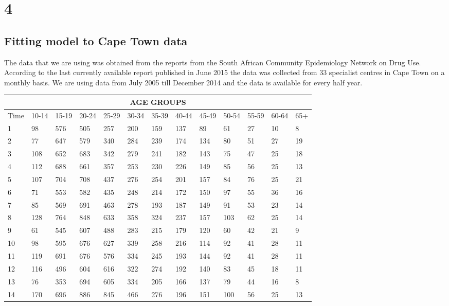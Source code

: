 \chapter{4}
\section{Fitting model to Cape Town data}
The data that we are using was obtained from the reports from the South African Community Epidemiology Network on Drug Use. According to the last currently available report published in June 2015 the data was collected from 33 specialist centres in Cape Town on a monthly basis. We are using data from July 2005 till December 2014 and the data is available for every half year.

\begin{table}[h!]\label{data1}
\noindent\begin{tabular}{|l|l|l|l|l|l|l|l|l|l|l|l|l|}
\hline
\multicolumn{13}{|c|}{AGE GROUPS} \\
\hline
 Time&10-14&15-19&20-24&25-29&30-34&35-39&40-44&45-49&50-54&55-59&60-64&65+ \\ \hline
1&  98 &576& 505&257   &200&159& 137& 89  &61&27& 10&8   \\ \hline
2&   77&647&579 & 340  &284&239&174 & 134  &80&51&27 &19   \\ \hline
3&  108&652& 683& 342  &279&241& 182&143   &75&47& 25&18   \\ \hline
4& 112& 688  &661&357&253 & 230  &226&149&85 &56 &25 &13\\ \hline
5& 107&704& 708  &437&276&254 & 201  &157&84& 76&25   &21 \\ \hline
6& 71 &553& 582& 435  &248&214&172 & 150  &97&55&36 & 16 \\ \hline  
7& 85 & 569  &691&463&278 &193   &187&149&91 &53 &23&14 \\ \hline
8& 128&764& 848&633   &358&324&237 & 157  &103&62&25 &14 \\ \hline
9& 61&545&607 & 488  &283&215&179 & 120  &60&42&21 &9 \\ \hline
10& 98&595& 676&627   &339&258&216 &114  &92&41&28 &11   \\ \hline
11& 119&691&676 &576   &334&245&193 &144   &92&41&28 &11\\ \hline
 12&116&496&604 &616   &322&274&192 & 140  &83&45& 18&11 \\ \hline
13& 76&353&694 &605   &334&205&166 & 137  &79&44& 16&8   \\ \hline
14&  170 &696&886 &845   &466&276&196 & 151  &100&56&25 &13   \\ \hline  

\end{tabular}
\end{table}
